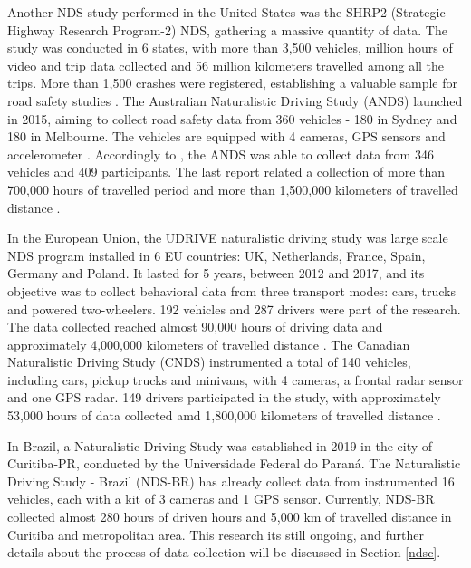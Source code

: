 Another NDS study performed in the United States was the SHRP2 (Strategic Highway Research Program-2) NDS, gathering a massive quantity of data. The study was conducted in 6 states, with more than 3,500 vehicles, million hours of video and trip data collected and 56 million kilometers travelled among all the trips. More than 1,500 crashes were registered, establishing a valuable sample for road safety studies \cite{Njord2015}. The Australian Naturalistic Driving Study (ANDS) launched in 2015, aiming to collect road safety data from 360 vehicles - 180 in Sydney and 180 in Melbourne. The vehicles are equipped with 4 cameras, GPS sensors and accelerometer \cite{ANDS2017a}. Accordingly to \textcite{Larue2019}, the ANDS was able to collect data from 346 vehicles and 409 participants. The last report related a collection of more than 700,000 hours of travelled period and more than 1,500,000 kilometers of travelled distance \cite{ANDS2017a}. 

In the European Union, the UDRIVE naturalistic driving study was large scale NDS program installed in 6 EU countries: UK, Netherlands, France, Spain, Germany and Poland. It lasted for 5 years, between 2012 and 2017, and its objective was to collect behavioral data from three transport modes: cars, trucks and powered two-wheelers. 192 vehicles and 287 drivers were part of the research. The data collected reached almost 90,000 hours of driving data and approximately 4,000,000 kilometers of travelled distance \cite{VanNes2019}. The Canadian Naturalistic Driving Study (CNDS) instrumented a total of 140 vehicles, including cars, pickup trucks and minivans, with 4 cameras, a frontal radar sensor and one GPS radar. 149 drivers participated in the study, with approximately 53,000 hours of data collected amd 1,800,000 kilometers of travelled distance \cite{CNDS2021}. 


In Brazil, a Naturalistic Driving Study was established in 2019 in the city of Curitiba-PR, conducted by the Universidade Federal do Paraná. The Naturalistic Driving Study - Brazil (NDS-BR) has already collect data from instrumented 16 vehicles, each with a kit of 3 cameras and 1 GPS sensor. Currently, NDS-BR collected almost 280 hours of driven hours and 5,000 km of travelled distance in Curitiba and metropolitan area. This research its still ongoing, and further details about the process of data collection will be discussed in Section \ref{ndsc}.  

